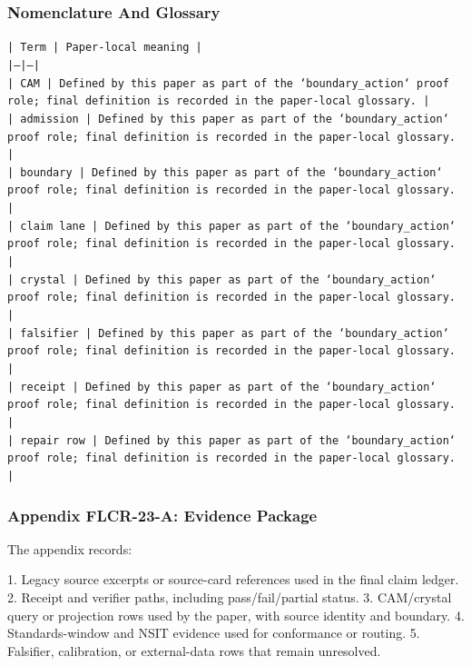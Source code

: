 \documentclass[11pt]{article}
\begin{document}
\subsubsection*{Nomenclature And Glossary}

\noindent\texttt{| Term | Paper-local meaning |}\\
\noindent\texttt{|---|---|}\\
\noindent\texttt{| CAM | Defined by this paper as part of the `boundary\_action` proof role; final definition is recorded in the paper-local glossary. |}\\
\noindent\texttt{| admission | Defined by this paper as part of the `boundary\_action` proof role; final definition is recorded in the paper-local glossary. |}\\
\noindent\texttt{| boundary | Defined by this paper as part of the `boundary\_action` proof role; final definition is recorded in the paper-local glossary. |}\\
\noindent\texttt{| claim lane | Defined by this paper as part of the `boundary\_action` proof role; final definition is recorded in the paper-local glossary. |}\\
\noindent\texttt{| crystal | Defined by this paper as part of the `boundary\_action` proof role; final definition is recorded in the paper-local glossary. |}\\
\noindent\texttt{| falsifier | Defined by this paper as part of the `boundary\_action` proof role; final definition is recorded in the paper-local glossary. |}\\
\noindent\texttt{| receipt | Defined by this paper as part of the `boundary\_action` proof role; final definition is recorded in the paper-local glossary. |}\\
\noindent\texttt{| repair row | Defined by this paper as part of the `boundary\_action` proof role; final definition is recorded in the paper-local glossary. |}\\

\subsubsection*{Appendix FLCR-23-A: Evidence Package}

The appendix records:

1. Legacy source excerpts or source-card references used in the final claim ledger.
2. Receipt and verifier paths, including pass/fail/partial status.
3. CAM/crystal query or projection rows used by the paper, with source identity and boundary.
4. Standards-window and NSIT evidence used for conformance or routing.
5. Falsifier, calibration, or external-data rows that remain unresolved.
\end{document}
